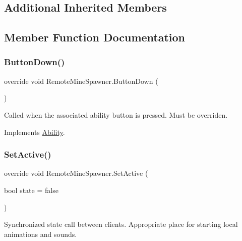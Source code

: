 \subsection*{Additional Inherited Members}


\subsection{Member Function Documentation}
\hypertarget{class_remote_mine_spawner_afc0682db95d366cbcb7db54fc4c192fa}{}\label{class_remote_mine_spawner_afc0682db95d366cbcb7db54fc4c192fa} 
\subsubsection{\texorpdfstring{Button\+Down()}{ButtonDown()}}
{\footnotesize\ttfamily override void Remote\+Mine\+Spawner.\+Button\+Down (\begin{DoxyParamCaption}{ }\end{DoxyParamCaption})\hspace{0.3cm}{\ttfamily [virtual]}}



Called when the associated ability button is pressed. Must be overriden. 



Implements \hyperlink{class_ability_a7722265862f8b29828315725415ce266}{Ability}.

\hypertarget{class_remote_mine_spawner_a187f725c8c3246bd9de8b4be05143a8e}{}\label{class_remote_mine_spawner_a187f725c8c3246bd9de8b4be05143a8e} 
\subsubsection{\texorpdfstring{Set\+Active()}{SetActive()}}
{\footnotesize\ttfamily override void Remote\+Mine\+Spawner.\+Set\+Active (\begin{DoxyParamCaption}\item[{bool}]{state = {\ttfamily false} }\end{DoxyParamCaption})\hspace{0.3cm}{\ttfamily [virtual]}}



Synchronized state call between clients. Appropriate place for starting local animations and sounds. 


